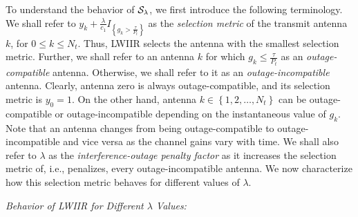 \documentclass[12pt,draftcls,peerreview,onecolumn]{IEEEtran}
\newcommand{\cbrac}[1]{\left\{{#1}\right\}}
\newcommand{\indic}[1]{I_{\cbrac{#1}}}
\newcommand{\lam}{\lambda}
\newcommand{\Nt}{{N_t}}
\newcommand{\Pt}{{P_t}}
\newcommand{\puch}{g}
\newcommand{\gk}[1]{{\puch_{#1}}}
\newcommand{\itau}{\tau}
\newcommand{\cone}{c_{1}}
\newcommand{\taubypt}{\frac{\itau}{\Pt}}
\newcommand{\gkgrtaubypt}[1]{{\gk{#1}}>\taubypt}
\newcommand{\gklttaubypt}[1]{{\gk{#1}}\leq\taubypt}
\newcommand{\gindic}[1]{\indic{\gkgrtaubypt{#1}}}
\newcommand{\lambym}{\frac{\lam}{\cone}}
\newcommand{\yk}[1]{y_{#1}}
\newcommand{\ykplusgk}[1]{ \yk{#1} + \lambym\gindic{#1}}
\newcommand{\antopts}{\left\{1,2,\ldots,\Nt\right\}}
\newcommand{\callamrule}{{\cal S_{{\lam}}}}
\begin{document}
To understand the behavior of $\callamrule$, we first introduce the following terminology. We shall refer to 
$\ykplusgk{k}$
as the {\em selection metric} of the transmit antenna $k$, for $0\leq k \leq\Nt$. Thus, LWIIR selects the antenna with the smallest selection metric. Further, we shall refer to an antenna $k$ for which $\gklttaubypt{k}$ as an {\em outage-compatible} antenna. Otherwise, we shall refer to it as an {\em outage-incompatible} antenna.  Clearly, antenna zero is always outage-compatible, and its selection metric is $\yk{0}=1$. On the other hand, antenna $k\in\antopts$ can be outage-compatible or outage-incompatible depending on the instantaneous value of $\gk{k}$. Note that an antenna changes from being outage-compatible to outage-incompatible and vice versa as the channel gains vary with time. We shall also refer to $\lam$ as the {\em interference-outage penalty factor} as it increases the selection metric of, i.e., penalizes, every outage-incompatible antenna. We now characterize  how this selection metric behaves for different values of $\lam$.

{\em Behavior of LWIIR for Different $\lam$ Values:}
\end{document}
